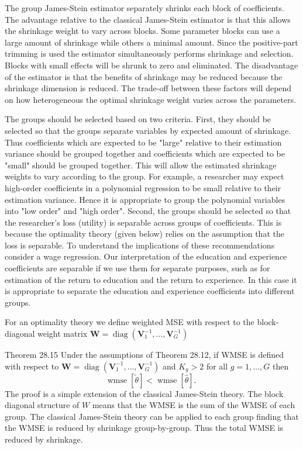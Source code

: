 \documentclass[10pt]{article}
\begin{document}
The group James-Stein estimator separately shrinks each block of coefficients. The advantage relative to the classical James-Stein estimator is that this allows the shrinkage weight to vary across blocks. Some parameter blocks can use a large amount of shrinkage while others a minimal amount. Since the positive-part trimming is used the estimator simultaneously performs shrinkage and selection. Blocks with small effects will be shrunk to zero and eliminated. The disadvantage of the estimator is that the benefits of shrinkage may be reduced because the shrinkage dimension is reduced. The trade-off between these factors will depend on how heterogeneous the optimal shrinkage weight varies across the parameters.

The groups should be selected based on two criteria. First, they should be selected so that the groups separate variables by expected amount of shrinkage. Thus coefficients which are expected to be "large" relative to their estimation variance should be grouped together and coefficients which are expected to be "small" should be grouped together. This will allow the estimated shrinkage weights to vary according to the group. For example, a researcher may expect high-order coefficients in a polynomial regression to be small relative to their estimation variance. Hence it is appropriate to group the polynomial variables into "low order" and "high order". Second, the groups should be selected so that the researcher's loss (utility) is separable across groups of coefficients. This is because the optimality theory (given below) relies on the assumption that the loss is separable. To understand the implications of these recommendations consider a wage regression. Our interpretation of the education and experience coefficients are separable if we use them for separate purposes, such as for estimation of the return to education and the return to experience. In this case it is appropriate to separate the education and experience coefficients into different groups.

For an optimality theory we define weighted MSE with respect to the block-diagonal weight matrix $\boldsymbol{W}=\operatorname{diag}\left(\boldsymbol{V}_{1}^{-1}, \ldots, \boldsymbol{V}_{G}^{-1}\right)$

Theorem 28.15 Under the assumptions of Theorem 28.12, if WMSE is defined with respect to $\boldsymbol{W}=\operatorname{diag}\left(\boldsymbol{V}_{1}^{-1}, \ldots, \boldsymbol{V}_{G}^{-1}\right)$ and $K_{g}>2$ for all $g=1, \ldots, G$ then
$$
\operatorname{wmse}[\widetilde{\theta}]<\operatorname{wmse}[\widehat{\theta}] \text {. }
$$
The proof is a simple extension of the classical James-Stein theory. The block diagonal structure of $W$ means that the WMSE is the sum of the WMSE of each group. The classical James-Stein theory can be applied to each group finding that the WMSE is reduced by shrinkage group-by-group. Thus the total WMSE is reduced by shrinkage.
\end{document}
